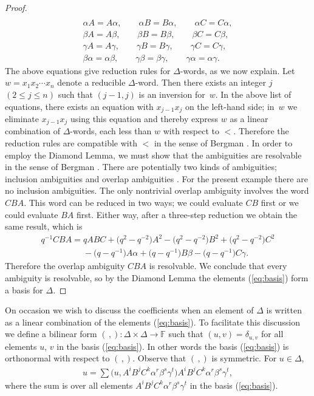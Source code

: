 \documentclass[11pt]{article}
\numberwithin{equation}{section}
\begin{document}
\begin{proof}
\begin{gather*}
\\
 \alpha A = A \alpha,
  \qquad
\alpha B = B \alpha,
  \qquad
\alpha C = C \alpha,
\\
 \beta A = A \beta,
  \qquad
\beta B = B \beta,
  \qquad
\beta C = C \beta,
\\
 \gamma A = A \gamma,
  \qquad
\gamma B = B \gamma,
  \qquad
\gamma C = C \gamma,
\\
 \beta \alpha = \alpha \beta,
  \qquad
\gamma \beta = \beta \gamma,
  \qquad
\gamma \alpha = \alpha \gamma.
\end{gather*}
The above equations give reduction rules
for $\Delta$-words,
as we now explain.
Let $w=x_1x_2\cdots x_n$ denote a  reducible $\Delta $-word.
Then there exists an integer $j$ $(2 \leq j \leq n)$
such that $(j-1,j)$ is an inversion for~$w$.
In the above list of equations,
there exists an equation
with $x_{j-1}x_j$ on the left-hand side;
in~$w$ we eliminate $x_{j-1}x_j$ using this equation
and thereby express $w$ as a linear combination of
$\Delta $-words, each less than $w$ with respect to $<$.
Therefore
the reduction rules are compatible
with $<$ in the sense of Bergman \cite[p.~181]{berg}.
In order to employ the Diamond Lemma,
we must show that
the ambiguities
are resolvable in the sense of Bergman
\cite[p.~181]{berg}.
There are potentially two kinds of ambiguities; inclusion
ambiguities and overlap ambiguities
\cite[p.~181]{berg}.
For the present example there are no inclusion ambiguities.
The only nontrivial overlap ambiguity
involves the word
$CBA$. This word can be reduced
in two ways; we could evaluate $CB$ f\/irst or we could
evaluate $BA$ f\/irst.
 Either way, after a three-step reduction
we obtain the same result, which is
\begin{gather*}
 q^{-1}CBA = qABC
+\big(q^2-q^{-2}\big)A^2
-\big(q^2-q^{-2}\big)B^2
+\big(q^2-q^{-2}\big)C^2
\\
\phantom{q^{-1}CBA =}{}
- \big(q-q^{-1}\big)A \alpha
+ \big(q-q^{-1}\big)B \beta
- \big(q-q^{-1}\big)C \gamma .
\end{gather*}
Therefore the
overlap ambiguity $CBA$ is re\-sol\-vable.
We conclude that every  ambiguity is
re\-sol\-vable, so
by the Diamond Lemma
\cite[Theorem~1.2]{berg}
the elements
(\ref{eq:basis}) form a basis for
$\Delta $.
\end{proof}

 On occasion we
wish to discuss the coef\/f\/icients
when an element of $\Delta$ is written as a linear
combination of the elements
(\ref{eq:basis}). To facilitate this discussion
we def\/ine a bilinear form
$(\,,) : \Delta \times \Delta \to \mathbb F$
such that $( u,v) = \delta_{u,v}$
for all elements $u$, $v$ in the basis
(\ref{eq:basis}). In other words
the basis
(\ref{eq:basis}) is
orthonormal with respect to
$( \,,) $.
 Observe that
$(\,,)$ is symmetric.
For $u \in \Delta$,
\begin{gather}
u = \sum \big(u, A^iB^jC^k\alpha^r\beta^s\gamma^t \big)
 A^iB^jC^k\alpha^r\beta^s\gamma^t,
\label{eq:bilsum}
\end{gather}
where the sum is over all elements
 $A^iB^jC^k\alpha^r\beta^s\gamma^t$ in the basis
(\ref{eq:basis}).
\end{document}
